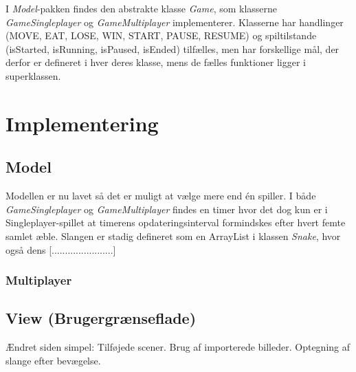 \documentclass{report}
\begin{document}
I \textit{Model}-pakken findes den abstrakte klasse \textit{Game}, som klasserne \textit{GameSingleplayer} og \textit{GameMultiplayer} implementerer. Klasserne har handlinger (MOVE, EAT, LOSE, WIN, START, PAUSE, RESUME) og spiltilstande (isStarted, isRunning, isPaused, isEnded) tilfælles, men har forskellige mål, der derfor er defineret i hver deres klasse, mens de fælles funktioner ligger i superklassen.

\section{Implementering}
\subsection{Model}
Modellen er nu lavet så det er muligt at vælge mere end én spiller. I både \textit{GameSingleplayer} og \textit{GameMultiplayer} findes en timer hvor det dog kun er i Singleplayer-spillet at timerens opdateringsinterval formindskes efter hvert femte samlet æble. Slangen er stadig defineret som en ArrayList i klassen \textit{Snake}, hvor også dens [.......................]

\subsubsection{Multiplayer}

\subsection{View (Brugergrænseflade)}
Ændret siden simpel: Tilføjede scener. Brug af importerede billeder. Optegning af slange efter bevægelse.
\end{document}
